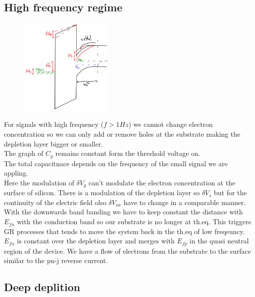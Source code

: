 \subsection{High frequency regime}

\begin{figure}
\includegraphics[width=0.4\textwidth]{hfbd.png}
\end{figure}
For signals with high frequency ($f>1Hz$) we cannot change electron concentration so we can only add or remove holes at the substrate making the depletion layer bigger or smaller.\\ 
The graph of $C_g$ remains constant form the threshold voltage on.\\
The total capacitnace depends on the frequency of the small signal we are appling.\\
Here the modulation of $\delta V_g$ can't modulate the electron concentration at the surface of silicon. There is a modulation of the depletion layer so $\delta V_s$ but for the continuity of the electric field olso $\delta V_{ox}$ have to change in a comparable manner. With the downwards band banding we have to keep constant the distance with $E_{fn}$ with the conduction band so our substrate is no longer at th.eq. This triggers GR processes that tends to move the system back in the th.eq of low freqeuncy.
$E_{fn}$ is constant over the depletion layer and merges with $E_{fp}$ in the quasi neutral region of the device. We have a flow of electrons from the substrate to the surface similar to the pn-j reverse current.\\

\subsection{Deep deplition}

